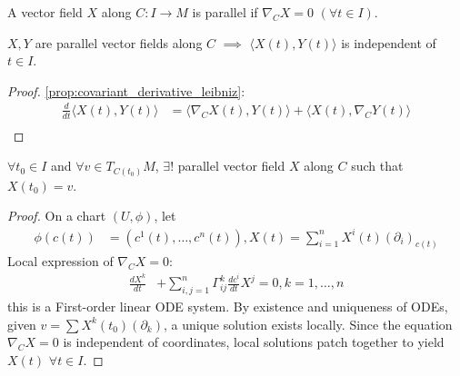 \begin{definition}
    A vector field $X$ along $C:I \to M$ is parallel if $\nabla_C X = 0$ $(\forall t \in I)$.
\end{definition}

\begin{lemma}
    $X,Y$ are parallel vector fields along $C$ $\implies$ $\langle X(t), Y(t) \rangle$ is independent of $t \in I$.
    \label{lemma:parallel_vector_fields_inner_product_constant}
\end{lemma}
\begin{proof}
\autoref{prop:covariant_derivative_leibniz}:
\[
\begin{aligned}
\frac{d}{dt} \langle X(t), Y(t) \rangle &= \langle \nabla_C X(t), Y(t) \rangle + \langle X(t), \nabla_C Y(t) \rangle \\
\end{aligned}
\]
\end{proof}

\begin{proposition}
    $\forall t_0 \in I$ and $\forall v \in T_{C(t_0)}M$, $\exists!$ parallel vector field $X$ along $C$ such that $X(t_0) = v$.
\end{proposition}
\begin{proof}
    On a chart $(U, \phi)$, let
    \[
    \begin{aligned}
        \phi(c(t)) &= (c^1(t), \dots, c^n (t)), X(t) = \sum^n_{i=1} X^i (t)(\partial_i)_{c(t)}
    \end{aligned}
    \]
    Local expression of $\nabla_C X = 0$:
    \[\begin{aligned}
        \frac{dX^k}{dt}& + \sum^n_{i,j=1} \Gamma_{ij}^k \frac{dc^i}{dt} X^j = 0, k =1, \dots, n
    \end{aligned}\]
    this is a First-order linear ODE system.
    By existence and uniqueness of ODEs, given $v = \sum X^k(t_0)(\partial_k)$, a unique solution exists locally.
    Since the equation $\nabla_C X = 0$ is independent of coordinates, local solutions patch together to yield $X(t)$ $\forall t \in I$.
\end{proof}

